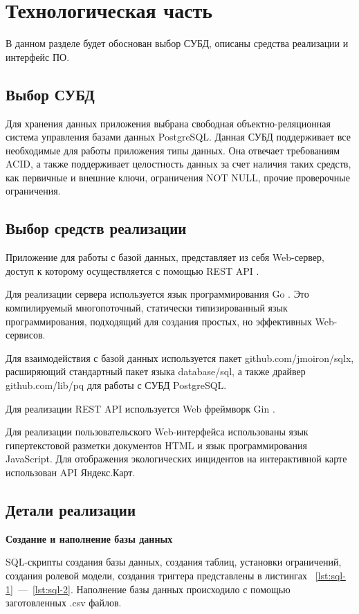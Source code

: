 \chapter{Технологическая часть}
В данном разделе будет обоснован выбор СУБД, описаны средства реализации и интерфейс ПО.  

\section{Выбор СУБД}
Для хранения данных приложения выбрана свободная объектно-реляционная система управления базами данных PostgreSQL. Данная СУБД поддерживает все необходимые для работы приложения типы данных. Она отвечает требованиям ACID, а также поддерживает целостность данных за счет наличия таких средств, как первичные и внешние ключи, ограничения NOT NULL, прочие проверочные ограничения. 

\section{Выбор средств реализации}
Приложение для работы с базой данных, представляет из себя Web-сервер, доступ к которому осуществляется с помощью REST API \cite{rest-api}.  

Для реализации сервера используется язык программирования Go \cite{golang}. Это компилируемый многопоточный, статически типизированный язык программирования, подходящий для создания простых, но эффективных Web-сервисов.  

Для взаимодействия с базой данных используется пакет github.com/jmoiron/sqlx\cite{sqlx}, расширяющий стандартный пакет языка database/sql\cite{gosql}, а также драйвер github.com/lib/pq\cite{pq} для работы с СУБД PostgreSQL.  

Для реализации REST API используется Web фреймворк Gin \cite{gin}. 

Для реализации пользовательского Web-интерфейса использованы язык гипертекстовой разметки документов HTML\cite{html} и язык программирования JavaScript\cite{js}. Для отображения экологических инцидентов на интерактивной карте использован API Яндекс.Карт\cite{map-api}.
 
\section{Детали реализации}

\noindent\textbf{Создание и наполнение базы данных}

SQL-скрипты создания базы данных, создания таблиц, установки ограничений, создания ролевой модели, создания триггера представлены в листингах ~\ref{lst:sql-1}~---~\ref{lst:sql-2}. Наполнение базы данных происходило с помощью заготовленных .csv файлов. 

